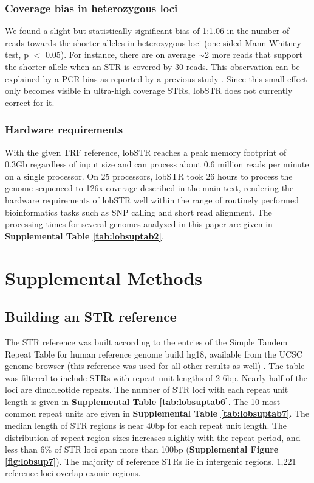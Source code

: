 \subsubsection{Coverage bias in heterozygous loci}
We found a slight but statistically significant bias of 1:1.06 in the number of reads towards the shorter alleles in heterozygous loci (one sided Mann-Whitney test, p $<$ 0.05). For instance, there are on average $\sim$2 more reads that support the shorter allele when an STR is covered by 30 reads.  This observation can be explained by a PCR bias as reported by a previous study \cite{WattierEngelSaumitou-LapradeEtAl1998}. Since this small effect only becomes visible in ultra-high coverage STRs, lobSTR does not currently correct for it.

\subsubsection{Hardware requirements}
With the given TRF reference, lobSTR reaches a peak memory footprint of 0.3Gb regardless of input size and can process about 0.6 million reads per minute on a single processor. On 25 processors, lobSTR took 26 hours to process the genome sequenced to 126x coverage described in the main text, rendering the hardware requirements of lobSTR well within the range of routinely performed bioinformatics tasks such as SNP calling and short read alignment. The processing times for several genomes analyzed in this paper are given in \textbf{Supplemental Table \ref{tab:lobsuptab2}}. 

\section{Supplemental Methods}
\subsection{Building an STR reference}
The STR reference was built according to the entries of the Simple Tandem Repeat Table for human reference genome build hg18, available from the UCSC genome browser (this reference was used for all other results as well) \cite{Kent2002}. The table was filtered to include STRs with repeat unit lengths of 2-6bp. Nearly half of the loci are dinucleotide repeats. The number of STR loci with each repeat unit length is given in \textbf{Supplemental Table \ref{tab:lobsuptab6}}. The 10 most common repeat units are given in \textbf{Supplemental Table \ref{tab:lobsuptab7}}. The median length of STR regions is near 40bp for each repeat unit length. The distribution of repeat region sizes increases slightly with the repeat period, and less than 6\% of STR loci span more than 100bp (\textbf{Supplemental Figure \ref{fig:lobsup7}}). The majority of reference STRs lie in intergenic regions. 1,221 reference loci overlap exonic regions.

